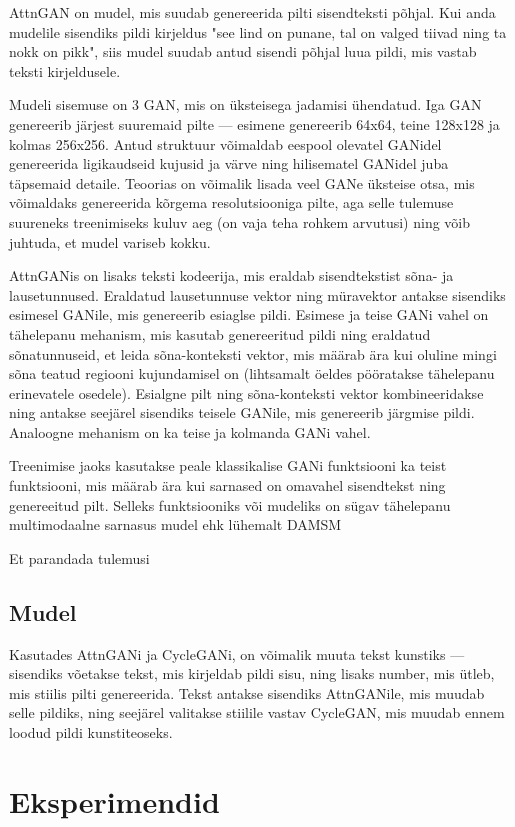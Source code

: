 \documentclass{vilgym}
\begin{document}
	AttnGAN on mudel, mis suudab genereerida pilti sisendteksti põhjal. Kui anda mudelile sisendiks pildi kirjeldus "see lind on punane, tal on valged tiivad ning ta nokk on pikk", siis mudel suudab antud sisendi põhjal luua pildi, mis vastab teksti kirjeldusele.
	
	Mudeli sisemuse on 3 GAN, mis on üksteisega jadamisi ühendatud. Iga GAN genereerib järjest suuremaid pilte --- esimene genereerib 64x64, teine 128x128 ja kolmas 256x256. Antud struktuur võimaldab eespool olevatel GANidel genereerida ligikaudseid kujusid ja värve ning hilisematel GANidel juba täpsemaid detaile. Teoorias on võimalik lisada veel GANe üksteise otsa, mis võimaldaks genereerida kõrgema resolutsiooniga pilte, aga selle tulemuse suureneks treenimiseks kuluv aeg (on vaja teha rohkem arvutusi) ning võib juhtuda, et mudel variseb kokku.

	AttnGANis on lisaks teksti kodeerija, mis eraldab sisendtekstist sõna- ja lausetunnused. Eraldatud lausetunnuse vektor ning müravektor antakse sisendiks esimesel GANile, mis genereerib esiaglse pildi. Esimese ja teise GANi vahel on tähelepanu mehanism, mis kasutab genereeritud pildi ning eraldatud sõnatunnuseid, et leida sõna-konteksti vektor, mis määrab ära kui oluline mingi sõna teatud regiooni kujundamisel on (lihtsamalt öeldes pööratakse tähelepanu erinevatele osedele). Esialgne pilt ning sõna-konteksti vektor kombineeridakse ning antakse seejärel sisendiks teisele GANile, mis genereerib järgmise pildi. Analoogne mehanism on ka teise ja kolmanda GANi vahel.

	Treenimise jaoks kasutakse peale klassikalise GANi funktsiooni ka teist funktsiooni, mis määrab ära kui sarnased on omavahel sisendtekst ning genereeitud pilt. Selleks funktsiooniks või mudeliks on sügav tähelepanu multimodaalne sarnasus mudel ehk lühemalt DAMSM 

	Et parandada tulemusi

	\subsection{Mudel}
	Kasutades AttnGANi ja CycleGANi, on võimalik muuta tekst kunstiks --- sisendiks võetakse tekst, mis kirjeldab pildi sisu, ning lisaks number, mis ütleb, mis stiilis pilti genereerida. Tekst antakse sisendiks AttnGANile, mis muudab selle pildiks, ning seejärel valitakse stiilile vastav CycleGAN, mis muudab ennem loodud pildi kunstiteoseks.


	\section{Eksperimendid}


	\nocite{*} %
	\printbibliography[title={Kasutatud allikad}]
\end{document}
